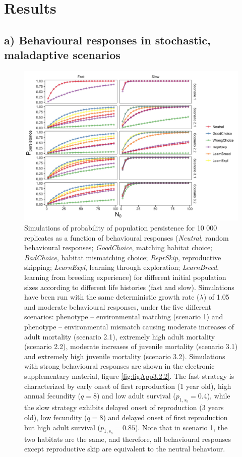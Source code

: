 \section{Results}

\subsection*{a) Behavioural responses in stochastic, maladaptive scenarios}

\begin{figure}
\centering
\includegraphics[width=\textwidth]{./Figures/chapter03/Fig_1.jpg}
\caption[Persistence as a function of LH, behviour and scenario]{
Simulations of probability of population persistence for 10 000 replicates as a
function of behavioural responses (\emph{Neutral}, random behavioural responses;
\emph{GoodChoice}, matching habitat choice; \emph{BadChoice}, habitat
mismatching choice; \emph{ReprSkip}, reproductive skipping; \emph{LearnExpl},
learning through exploration; \emph{LearnBreed}, learning from breeding
experience) for different initial population sizes according to different life
histories (fast and slow). Simulations have been run with the same deterministic
growth rate ($\lambda$) of 1.05 and moderate behavioural responses, under the
five different scenarios: phenotype – environmental matching (scenario 1) and
phenotype – environmental mismatch causing moderate increases of adult mortality
(scenario 2.1), extremely high adult mortality (scenario 2.2), moderate
increases of juvenile mortality (scenario 3.1) and extremely high juvenile
mortality (scenario 3.2). Simulations with strong behavioural responses are
shown in the electronic supplementary material, figure \ref{fig:figApp3.2.2}.
The fast strategy is characterized by early onset of first reproduction (1 year
old), high annual fecundity ($q = 8$) and low adult survival
($p_{1,s_{b}} = 0.4$), while the slow strategy exhibits delayed onset of
reproduction (3 years old), low fecundity ($q = 8$) and delayed onset of first
reproduction but high adult survival ($p_{1,s_{b}} = 0.85$). Note that in
scenario 1, the two habitats are the same, and therefore, all behavioural
responses except reproductive skip are equivalent to the neutral behaviour.}
\label{fig:fig3.1}
\end{figure}

